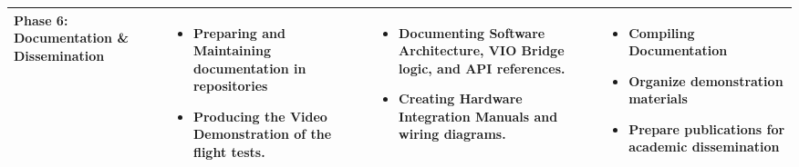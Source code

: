 \begin{table}[H]
{\begin{tabular}{|p{2cm}|p{4.3cm}|p{4.3cm}|p{4.3cm}|}
\textbf{Phase 6: Documentation \& Dissemination} &
\begin{itemize}[leftmargin=*, topsep=0pt, itemsep=0pt, parsep=0pt, partopsep=0pt]
  \item Preparing and Maintaining documentation in repositories
  \item Producing the Video Demonstration of the flight tests.
\end{itemize} &
\begin{itemize}[leftmargin=*, topsep=0pt, itemsep=0pt, parsep=0pt, partopsep=0pt]
  \item Documenting Software Architecture, VIO Bridge logic, and API references.
  \item Creating Hardware Integration Manuals and wiring diagrams.
\end{itemize} &
\begin{itemize}[leftmargin=*, topsep=0pt, itemsep=0pt, parsep=0pt, partopsep=0pt]
  \item Compiling Documentation
  \item Organize demonstration materials
  \item Prepare publications for academic dissemination
\end{itemize} \\
\hline

\end{tabular}}
\end{table}


